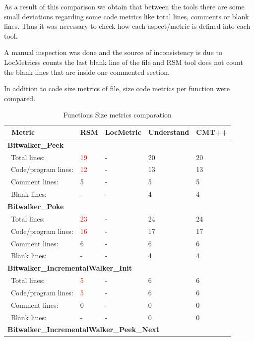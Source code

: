 As a result of this comparison we obtain that between the tools there are some small deviations regarding some code metrics like total lines, comments or blank lines. Thus it was necessary to check how each aspect/metric is defined into each tool.

A manual inspection was done and the source of inconsistency is due to LocMetricss counts the last blank line of the file and RSM tool does not count the blank lines that are inside one commented section.

In addition to code size metrics of file, size code metrics per function were compared.

\begin{longtable}{||p{}|p{}|p{}|p{}|p{}||}
  \caption{Functions Size metrics comparation}\\
    \hline\hline
    \endhead
    \hline\hline
    \endfoot
\ \textbf{Metric} & \textbf{RSM} & \textbf{LocMetric} & \textbf{Understand} & \textbf{CMT++}
\\\hline
\multicolumn{5}{||l||}{\textbf{Bitwalker\_Peek}}
\\\hline
\ Total lines: & \textcolor{red}{19} & - & 20 & 20
\\\hline
\ Code/program lines: & \textcolor{red}{12} & - & 13 & 13
\\\hline
\ Comment lines: & 5 & - & 5 & 5 
\\\hline
\ Blank lines: & - & - & 4 & 4
 \\\hline
 \multicolumn{5}{||l||}{\textbf{Bitwalker\_Poke}}
\\\hline
\ Total lines: & \textcolor{red}{23} & - & 24 & 24
\\\hline
\ Code/program lines: & \textcolor{red}{16} & - & 17 & 17
\\\hline
\ Comment lines: & 6 & - & 6 & 6 
\\\hline
\ Blank lines: & - & - & 4 & 4
 \\\hline
 \multicolumn{5}{||l||}{\textbf{Bitwalker\_IncrementalWalker\_Init}}
\\\hline
\ Total lines: & \textcolor{red}{5} & - & 6 & 6
\\\hline
\ Code/program lines: & \textcolor{red}{5} & - & 6 & 6
\\\hline
\ Comment lines: & 0 & - & 0 & 0 
\\\hline
\ Blank lines: & - & - & 0 & 0
 \\\hline
 \multicolumn{5}{||l||}{\textbf{Bitwalker\_IncrementalWalker\_Peek\_Next}}

\end{longtable}
